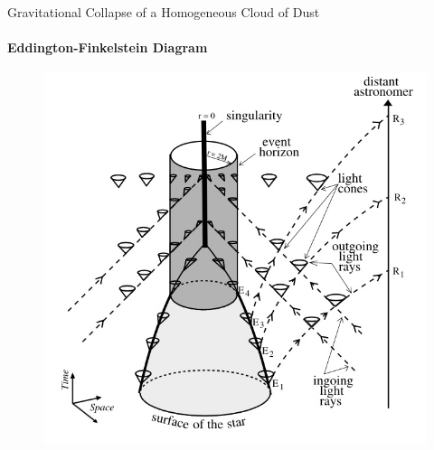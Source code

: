 \documentclass{beamer}
\begin{document}
\begin{frame}{Gravitational Collapse of a Homogeneous Cloud of Dust}
\framesubtitle{Eddington-Finkelstein Diagram}
	\begin{center}
      \begin{figure}
      	\includegraphics[scale=0.25] {figures/EFCollapse2.jpeg}
      \end{figure}
	\end{center}	
\end{frame}
\end{document}
